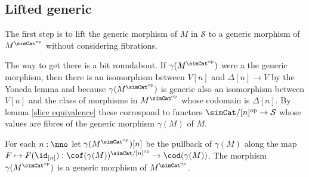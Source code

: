 \documentclass{tac}
\newcommand\cat\mathcal
\newcommand\dual{^{\mathrm{op}}}
\newcommand\s{^{\simCat\dual}}
\newcommand\of{:}
\newcommand\simplex\Delta
\newcommand\gen\gamma
\begin{document}
\subsection{Lifted generic}
The first step is to lift the generic morphism of $M$ in $\cat S$ to a generic morphism of $M\s$ without considering fibrations. 

The way to get there is a bit roundabout. If $\gen(M\s)$ were a the generic morphism, then there is an isomorphism between $V[n]$ and $\simplex[n]\to V$ by the Yoneda lemma and because $\gen(M\s)$ is generic also an isomorphism between $V[n]$ and the class of morphisms in $M\s$ whose codomain is $\simplex[n]$. By lemma \ref{slice equivalence} these correspond to functors $\simCat/[n]\dual\to\cat S$ whose values are fibres of the generic morphism $\gen(M)$ of $M$. 

\begin{lemma}
For each $n\of\nno$ let $\gen(M\s)[n]$ be the pullback of $\gen(M)$ along the map $F\mapsto F(\id_{[n]})\of\cof(\gen(M))^{\simCat/[n]\dual}\to \cod(\gen(M))$. The morphism $\gen(M\s)$ is a generic morphism of $M\s$.
\end{lemma}
\end{document}
